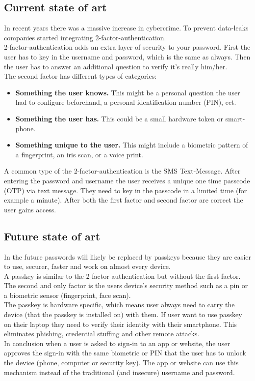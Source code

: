 \documentclass[conference]{IEEEtran}
\begin{document}
\subsection{Current state of art}
In recent years there was a massive increase in cybercrime. To prevent data-leaks companies started integrating 2-factor-authentication.\\
2-factor-authentication adds an extra layer of security to your password. First the user has to key in the username and password, which is the same as always. Then the user has to answer an additional question to verify it's really him/her.\\
The second factor has different types of categories:
\begin{itemize}
\item \textbf{Something the user knows.}  This might be a personal question the user had to configure beforehand, a personal identification number (PIN), ect.
\item \textbf{Something the user has.} This could be a small hardware token or smart-phone.
\item \textbf{Something unique to the user.} This might include a  biometric pattern of a fingerprint, an iris scan, or a voice print. 
\end{itemize}
A common type of the 2-factor-authentication is the SMS Text-Message. After entering the password and username the user receives a unique one time passcode (OTP) via text message. They need to key in the passcode in a limited time (for example a minute). After both the first factor and second factor are correct the user gains access.
                                                                                               
\subsection{Future state of art}
In the future passwords will likely be replaced by passkeys because they are easier to use, securer, faster and work on almost every device.\\
A passkey is similar to the 2-factor-authentication but without the first factor. The second and only factor is the users device's security method such as a pin or a biometric sensor (fingerprint, face scan). \\
The passkey is hardware specific, which means user always need to carry the device (that the passkey is installed on) with them. If user want to use passkey on their laptop they need to verify their identity with their smartphone. This eliminates phishing, credential stuffing and other remote attacks. \\
In conclusion when a user is asked to sign-in to an app or website, the user approves the sign-in with the same biometric or PIN that the user has to unlock the device 
(phone, computer or security key). The app or website can use this mechanism instead of the traditional (and insecure) username and password. 
\end{document}
